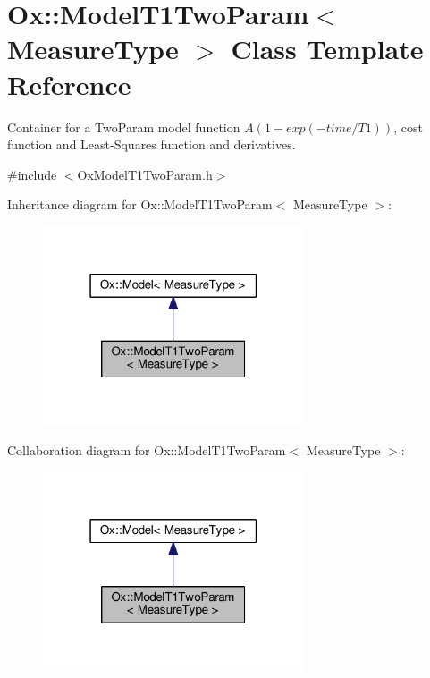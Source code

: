 \hypertarget{class_ox_1_1_model_t1_two_param}{}\section{Ox\+:\+:Model\+T1\+Two\+Param$<$ Measure\+Type $>$ Class Template Reference}
\label{class_ox_1_1_model_t1_two_param}


Container for a Two\+Param model function $ A(1 - exp( -time / T1 )) $, cost function and Least-\/\+Squares function and derivatives.  




{\ttfamily \#include $<$Ox\+Model\+T1\+Two\+Param.\+h$>$}



Inheritance diagram for Ox\+:\+:Model\+T1\+Two\+Param$<$ Measure\+Type $>$\+:
\nopagebreak
\begin{figure}[H]
\begin{center}
\leavevmode
\includegraphics[width=219pt]{class_ox_1_1_model_t1_two_param__inherit__graph}
\end{center}
\end{figure}


Collaboration diagram for Ox\+:\+:Model\+T1\+Two\+Param$<$ Measure\+Type $>$\+:
\nopagebreak
\begin{figure}[H]
\begin{center}
\leavevmode
\includegraphics[width=219pt]{class_ox_1_1_model_t1_two_param__coll__graph}
\end{center}
\end{figure}
